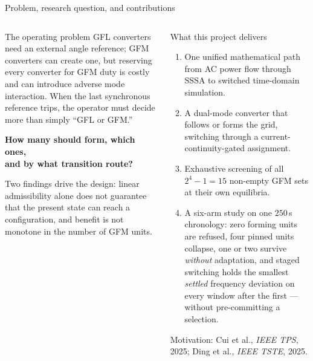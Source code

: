 \documentclass[aspectratio=169,10pt]{beamer}
\begin{document}
\begin{frame}[shrink=4]{Problem, research question, and contributions}
\begin{columns}[T,onlytextwidth]
\begin{alertblock}{The operating problem}
\footnotesize
GFL converters need an external angle reference; GFM converters can create one,
but reserving every converter for GFM duty is costly and can introduce adverse
mode interaction. When the last synchronous reference trips, the operator must
decide more than simply ``GFL or GFM.''
\vspace{0.25em}
\begin{center}
\large\bfseries How many should form, which ones,\\and by what transition route?
\end{center}
\vspace{0.1em}
Two findings drive the design: linear admissibility alone does not guarantee
that the present state can reach a configuration, and benefit is not monotone
in the number of GFM units.
\end{alertblock}
\begin{block}{What this project delivers}
\begin{enumerate}\footnotesize
  \item One unified mathematical path from AC power flow through SSSA to
        switched time-domain simulation.
  \item A dual-mode converter that follows or forms the grid, switching
        through a current-continuity-gated assignment.
  \item Exhaustive screening of all $2^4-1=15$ non-empty GFM sets at their own
        equilibria.
  \item A six-arm study on one $250$\,s chronology: zero forming units are
        refused, four pinned units collapse, one or two survive \emph{without}
        adaptation, and staged switching holds the smallest \emph{settled}
        frequency deviation on every window after the first --- without
        pre-committing a selection.
\end{enumerate}
\vspace{0.1em}
{\scriptsize Motivation: Cui et al., \emph{IEEE TPS}, 2025; Ding et al.,
\emph{IEEE TSTE}, 2025.}
\end{block}
\end{columns}
\end{frame}
\end{document}
